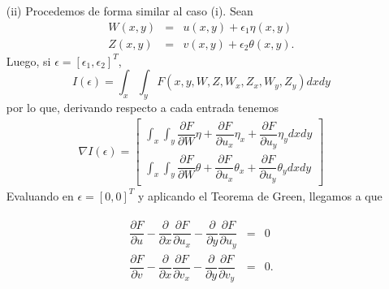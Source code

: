 \documentclass[11pt,letterpaper]{article}
\theoremstyle{definition}
\theoremstyle{definition}
\theoremstyle{definition}
\begin{document}
\begin{itemize}
\item[(ii)] Procedemos de forma similar al caso (i). Sean
\begin{eqnarray*}
	W(x, y) & = & u(x,y) + \epsilon_1 \eta (x,y) \\
	Z(x,y) & = & v(x,y) + \epsilon_2 \theta (x,y).
\end{eqnarray*}
Luego, si $ \epsilon = [\epsilon_1, \epsilon_2]^T $,
\small{\begin{equation*}
	I(\epsilon) = \int_x \int_y F (x,y,W,Z,W_x, Z_x, W_y, Z_y) dx dy
\end{equation*}}
por lo que, derivando respecto a cada entrada tenemos
\begin{eqnarray*}
	\nabla I(\epsilon) = \left[ \begin{matrix}
								\int_x \int_y \dfrac{\partial F}{\partial W} \eta + \dfrac{\partial F}{\partial u_x} \eta_x + \dfrac{\partial F}{\partial u_y} \eta_y dx dy \\
								\int_x \int_y \dfrac{\partial F}{\partial W} \theta + \dfrac{\partial F}{\partial u_x} \theta_x + \dfrac{\partial F}{\partial u_y} \theta_y dx dy
						   \end{matrix} \right]
\end{eqnarray*}
Evaluando en $ \epsilon = [0,0]^T $ y aplicando el Teorema de Green, llegamos a que 
\begin{shaded*}
	\begin{eqnarray}
		 \begin{matrix}
			\dfrac{\partial F}{\partial u} - \dfrac{\partial}{\partial x} \dfrac{\partial F}{\partial u_x}  - \dfrac{\partial}{\partial y} \dfrac{\partial F}{\partial u_y}  & = & 0\\
			\dfrac{\partial F}{\partial v} - \dfrac{\partial}{\partial x} \dfrac{\partial F}{\partial v_x}  - \dfrac{\partial}{\partial y} \dfrac{\partial F}{\partial v_y} & = & 0.
		\end{matrix}
	\end{eqnarray}
\end{shaded*}
\end{itemize}
\end{document}

